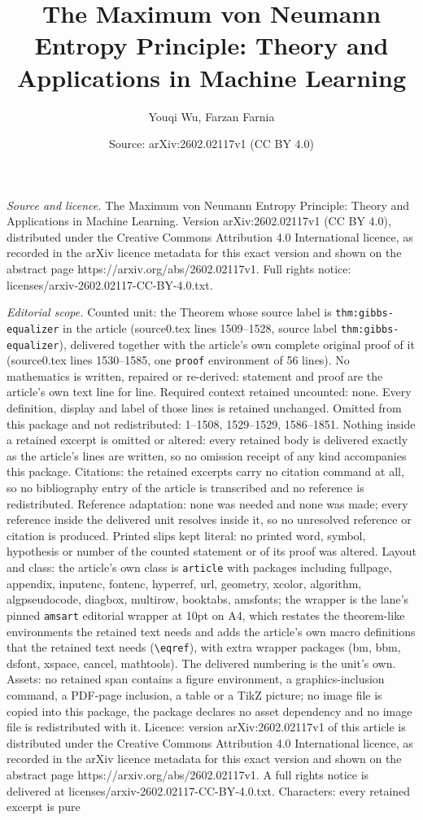 \documentclass[10pt,a4paper]{amsart}
\title[The Maximum von Neumann Entropy Principle: Theory and Applic]{The Maximum von Neumann Entropy Principle: Theory and Applications in Machine Learning}
\author{Youqi Wu, Farzan Farnia}
\date{Source: arXiv:2602.02117v1 (CC BY 4.0)}
\begin{document}
\maketitle

\noindent\emph{Source and licence.} The Maximum von Neumann Entropy Principle: Theory and Applications in Machine Learning. Version arXiv:2602.02117v1 (CC BY 4.0), distributed under the Creative Commons Attribution 4.0 International licence, as recorded in the arXiv licence metadata for this exact version and shown on the abstract page https://arxiv.org/abs/2602.02117v1. Full rights notice: licenses/arxiv-2602.02117-CC-BY-4.0.txt.\par\smallskip

\noindent\textit{Editorial scope.} Counted unit: the Theorem whose source label is \texttt{thm:gibbs-equalizer} in the article (source0.tex lines 1509--1528, source label \texttt{thm:gibbs-equalizer}), delivered together with the article's own complete original proof of it (source0.tex lines 1530--1585, one \texttt{proof} environment of 56 lines). No mathematics is written, repaired or re-derived: statement and proof are the article's own text line for line. Required context retained uncounted: none. Every definition, display and label of those lines is retained unchanged. Omitted from this package and not redistributed: 1--1508, 1529--1529, 1586--1851. Nothing inside a retained excerpt is omitted or altered: every retained body is delivered exactly as the article's lines are written, so no omission receipt of any kind accompanies this package. Citations: the retained excerpts carry no citation command at all, so no bibliography entry of the article is transcribed and no reference is redistributed. Reference adaptation: none was needed and none was made; every reference inside the delivered unit resolves inside it, so no unresolved reference or citation is produced. Printed slips kept literal: no printed word, symbol, hypothesis or number of the counted statement or of its proof was altered. Layout and class: the article's own class is \texttt{article} with packages including fullpage, appendix, inputenc, fontenc, hyperref, url, geometry, xcolor, algorithm, algpseudocode, diagbox, multirow, booktabs, amsfonts; the wrapper is the lane's pinned \texttt{amsart} editorial wrapper at 10pt on A4, which restates the theorem-like environments the retained text needs and adds the article's own macro definitions that the retained text needs (\texttt{\textbackslash eqref}), with extra wrapper packages (bm, bbm, dsfont, xspace, cancel, mathtools). The delivered numbering is the unit's own. Assets: no retained span contains a figure environment, a graphics-inclusion command, a PDF-page inclusion, a table or a TikZ picture; no image file is copied into this package, the package declares no asset dependency and no image file is redistributed with it. Licence: version arXiv:2602.02117v1 of this article is distributed under the Creative Commons Attribution 4.0 International licence, as recorded in the arXiv licence metadata for this exact version and shown on the abstract page https://arxiv.org/abs/2602.02117v1. A full rights notice is delivered at licenses/arxiv-2602.02117-CC-BY-4.0.txt. Characters: every retained excerpt is pure 
\end{document}
